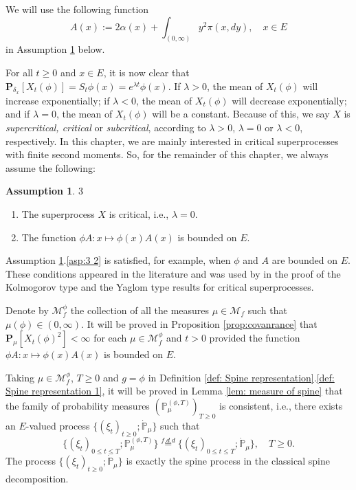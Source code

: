 \documentclass[UTF8]{pkuthss}
\theoremstyle{plain}
\theoremstyle{definition}
\newtheorem{asp}{Assumption}[chapter]
\numberwithin{equation}{section}
\begin{document}
We will use the following function
 \[
	A(x)
	:= 2\alpha(x) + \int_{(0,\infty)} y^2\pi(x,dy),
	\quad x\in E
  \]
in Assumption \ref{asp:3} below.


	For all $t \geq 0$ and $x\in E$, it is now clear that
$
  \mathbf P_{\delta_x}[X_t(\phi)]
  = S_t \phi(x)
  = e^{\lambda t} \phi(x).
$
  If $\lambda > 0$, the mean of $X_t(\phi)$ will increase exponentially; if $\lambda < 0$, the mean of $X_t(\phi)$ will decrease exponentially; and if $\lambda = 0$, the mean of $X_t(\phi)$ will be a constant.
  Because of this, we say $X$ is \emph{supercritical, critical} or \emph{subcritical}, according to $\lambda > 0$, $\lambda = 0$ or $\lambda < 0$, respectively.
	In this chapter, we are mainly interested in critical superprocesses with finite second moments.
So, for the remainder of this chapter, we always assume the following:
\begin{asp}{$3$}\label{asp:3}
\begin{enumerate}
\item \label{asp:3 1} 
	The superprocess $X$ is critical, i.e., $\lambda = 0 $.
\item \label{asp:3 2} 
	The function $\phi A:x\mapsto \phi(x)A(x)$  is bounded on $E$.
\end{enumerate}
\end{asp}

	Assumption \ref{asp:3}.\eqref{asp:3 2} is satisfied, for example, when $\phi$ and $A$ are bounded on $E$.
	These conditions appeared in the literature and was used by \cite{RenSongZhang2015Limit} in the proof of the Kolmogorov type and the Yaglom type results for critical superprocesses.

 	Denote by $\mathcal M_f^\phi$ the collection of all the measures $\mu \in \mathcal M_f$ such that $\mu(\phi) \in (0,\infty)$.
  	It will be proved in Proposition \ref{prop:covanrance} that $\mathbf P_\mu[X_t(\phi)^2]< \infty$ for each $\mu \in \mathcal M^\phi_f$ and $t>0$ provided the function
$
	\phi A: x\mapsto \phi(x) A(x)
$
	is bounded on $E$.


	Taking $\mu \in \mathcal M_f^{\phi}$, $T\geq 0$ and $g = \phi$ in Definition \ref{def: Spine representation}.\eqref{def: Spine representation 1}, it will be proved in Lemma \ref{lem: measure of spine} that the family of probability measures $(\mathbb P_\mu^{(\phi,T)})_{T\geq 0}$ is consistent,
	i.e., there exists an $E$-valued process $\{(\xi_t)_{t\geq 0}; \dot{\mathbb P}_\mu\}$ such that
\[	\{(\xi_t)_{0\leq t\leq T}; \mathbb P_\mu^{(\phi,T)}\}
	\overset{f.d.d}{=}\{(\xi_t)_{0\leq t\leq T}; \dot{\mathbb P}_\mu\},
	\quad T\geq 0.
\]	
	The process $\{(\xi_t)_{t\geq 0}; \dot{\mathbb P}_\mu\}$ is exactly the spine process in the classical spine decomposition.
\end{document}
